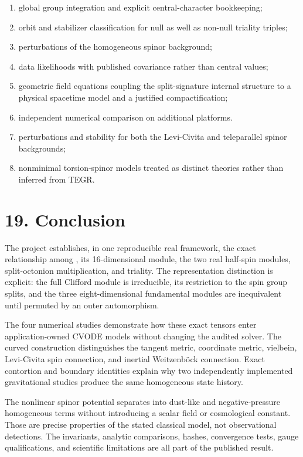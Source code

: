 \documentclass[11pt]{article}
\begin{document}
\begin{enumerate}
\item global group integration and explicit central-character bookkeeping;
\item orbit and stabilizer classification for null as well as non-null triality
triples;

\item perturbations of the homogeneous spinor background;
\item data likelihoods with published covariance rather than central values;
\item geometric field equations coupling the split-signature internal structure
to a physical \texttt{} spacetime model and a justified compactification;

\item independent numerical comparison on additional platforms.
\item perturbations and stability for both the Levi-Civita and teleparallel
spinor backgrounds;

\item nonminimal torsion-spinor models treated as distinct theories rather than
inferred from TEGR.

\end{enumerate}

\section{19. Conclusion}

The project establishes, in one reproducible real framework, the exact relationship among \texttt{}, its 16-dimensional module, the two real half-spin modules, split-octonion multiplication, and triality. The representation distinction is explicit: the full Clifford module is irreducible, its restriction to the spin group splits, and the three eight-dimensional fundamental modules are inequivalent until permuted by an outer automorphism.

The four numerical studies demonstrate how these exact tensors enter application-owned CVODE models without changing the audited solver. The curved construction distinguishes the tangent metric, coordinate metric, vielbein, Levi-Civita spin connection, and inertial Weitzenböck connection. Exact contortion and boundary identities explain why two independently implemented gravitational studies produce the same homogeneous state history.

The nonlinear spinor potential separates into dust-like and negative-pressure homogeneous terms without introducing a scalar field or cosmological constant. Those are precise properties of the stated classical model, not observational detections. The invariants, analytic comparisons, hashes, convergence tests, gauge qualifications, and scientific limitations are all part of the published result.
\end{document}
